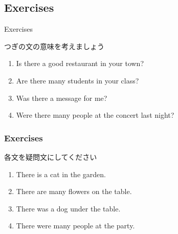 \documentclass[aspectratio=169,xcolor={dvipsnames,table}]{beamer}
\newcommand{\myaudio}[1]{\href{#1}{\faVolumeUp}}
\begin{document}
 \subsection{Exercises}
\begin{frame}[plain]{Exercises}

つぎの文の意味を考えましょう
\begin{enumerate}
 \item Is there a good restaurant in your town?
 \item Are there many students in your class?
 \item Was there a message for me?
 \item Were there many people at the concert last night?
\end{enumerate}

\hfill\myaudio{./audio/001_there_is_07.mp3}
\end{frame}
\begin{frame}[plain]\frametitle{Exercises}
各文を疑問文にしてください\hfill\myaudio{./audio/001_there_is_08.mp3}

  \begin{enumerate}
   \item There is a cat in the garden.\\
   \item There are many flowers on the table.\\
   \item There was a dog under the table.\\
   \item There were many people at the party.\\
  \end{enumerate}
\end{frame}
\end{document}

